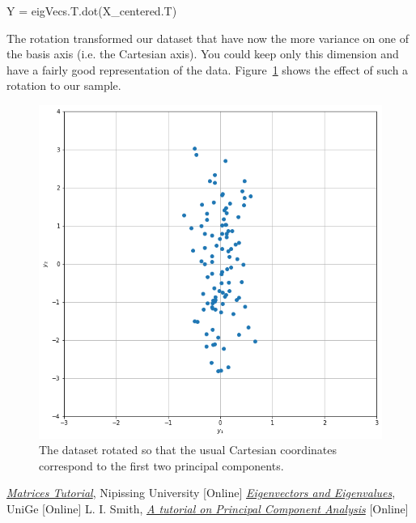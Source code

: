 \begin{ipython}
Y = eigVecs.T.dot(X_centered.T)
\end{ipython}

The rotation transformed our dataset that have now the more variance on one of the basis axis (i.e. the Cartesian axis). 
You could keep only this dimension and have a fairly good representation of the data. Figure~\ref{fig:pca_rotated} shows the effect of such a rotation to our sample.
\clearpage
\begin{figure}[htb]
	\centering
	\includegraphics[width=0.5\linewidth]{figures/pca_rotated}
	\caption{The dataset rotated so that the usual Cartesian coordinates
		correspond to the first two principal components.}
	\label{fig:pca_rotated}
\end{figure}

\begin{thebibliography}{9}
\href{https://algebra.nipissingu.ca/tutorials/matrices.html}{\emph{Matrices Tutorial}}, Nipissing University [Online]
\href{http://macosa.dima.unige.it/mat/calculus/eigenstuff.htm}{\emph{Eigenvectors and Eigenvalues}}, UniGe [Online]
 L. I. Smith, \href{http://www.iro.umontreal.ca/~pift6080/H09/documents/papers/pca_tutorial.pdf}{\emph{A tutorial on Principal Component Analysis}} [Online]
\end{thebibliography}






